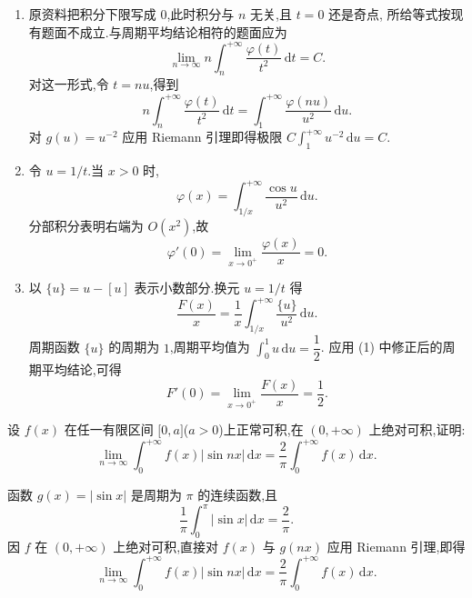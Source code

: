 \begin{solution}
  \leavevmode
  \begin{enumerate}
    \item 原资料把积分下限写成 $0$,此时积分与 $n$ 无关,且 $t=0$ 还是奇点,
          所给等式按现有题面不成立.与周期平均结论相符的题面应为
          \[
            \displaystyle\lim\limits_{n\to\infty}n\int_n^{+\infty}\dfrac{\varphi(t)}{t^2}\,\mathrm{d}t=C.
          \]
          对这一形式,令 $t=nu$,得到
          \[
            n\int_n^{+\infty}\dfrac{\varphi(t)}{t^2}\,\mathrm{d}t
            =\int_1^{+\infty}\dfrac{\varphi(nu)}{u^2}\,\mathrm{d}u.
          \]
          对 $g(u)=u^{-2}$ 应用 Riemann 引理即得极限
          $C\displaystyle\int_1^{+\infty}u^{-2}\,\mathrm{d}u=C$.

    \item 令 $u=1/t$.当 $x>0$ 时,
          \[
            \varphi(x)=\int_{1/x}^{+\infty}\dfrac{\cos u}{u^2}\,\mathrm{d}u.
          \]
          分部积分表明右端为 $O(x^2)$,故
          \[
            \varphi'(0)=\lim\limits_{x\to0^+}\dfrac{\varphi(x)}{x}=0.
          \]

    \item 以 $\{u\}=u-[u]$ 表示小数部分.换元 $u=1/t$ 得
          \[
            \dfrac{F(x)}{x}
            =\dfrac{1}{x}\int_{1/x}^{+\infty}\dfrac{\{u\}}{u^2}\,\mathrm{d}u.
          \]
          周期函数 $\{u\}$ 的周期为 $1$,周期平均值为
          $\displaystyle\int_0^1u\,\mathrm{d}u=\dfrac{1}{2}$.
          应用 (1) 中修正后的周期平均结论,可得
          \[
            F'(0)=\lim\limits_{x\to0^+}\dfrac{F(x)}{x}=\dfrac{1}{2}.
          \]
  \end{enumerate}
\end{solution}

\begin{example}
  设 $f(x)$ 在任一有限区间 $\lbrack 0,a\rbrack$($a>0$)上正常可积,在 $(0,+\infty)$ 上绝对可积,证明:
  \[
    \displaystyle\lim\limits_{n\to\infty}\int_0^{+\infty}f(x)|\sin nx|\,\mathrm{d}x
    =\dfrac{2}{\pi}\int_0^{+\infty}f(x)\,\mathrm{d}x.
  \]
\end{example}
\exampleblank

\begin{solution}
  函数 $g(x)=|\sin x|$ 是周期为 $\pi$ 的连续函数,且
  \[
    \dfrac{1}{\pi}\int_0^\pi|\sin x|\,\mathrm{d}x=\dfrac{2}{\pi}.
  \]
  因 $f$ 在 $(0,+\infty)$ 上绝对可积,直接对 $f(x)$ 与 $g(nx)$ 应用
  Riemann 引理,即得
  \[
    \displaystyle\lim\limits_{n\to\infty}\int_0^{+\infty}f(x)|\sin nx|\,\mathrm{d}x
    =\dfrac{2}{\pi}\int_0^{+\infty}f(x)\,\mathrm{d}x.
  \]
\end{solution}


